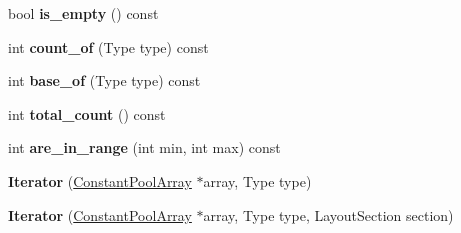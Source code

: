 \begin{DoxyCompactItemize}
\item 
\hypertarget{classv8_1_1internal_1_1_constant_pool_array_1_1_b_a_s_e___e_m_b_e_d_d_e_d_aef857b7d8765f26626cc341cf49f1578}{}bool {\bfseries is\+\_\+empty} () const \label{classv8_1_1internal_1_1_constant_pool_array_1_1_b_a_s_e___e_m_b_e_d_d_e_d_aef857b7d8765f26626cc341cf49f1578}

\item 
\hypertarget{classv8_1_1internal_1_1_constant_pool_array_1_1_b_a_s_e___e_m_b_e_d_d_e_d_aba6866eb837754b3c02573980bdd0345}{}int {\bfseries count\+\_\+of} (Type type) const \label{classv8_1_1internal_1_1_constant_pool_array_1_1_b_a_s_e___e_m_b_e_d_d_e_d_aba6866eb837754b3c02573980bdd0345}

\item 
\hypertarget{classv8_1_1internal_1_1_constant_pool_array_1_1_b_a_s_e___e_m_b_e_d_d_e_d_ac530db406f0110ab6c735ac22629d202}{}int {\bfseries base\+\_\+of} (Type type) const \label{classv8_1_1internal_1_1_constant_pool_array_1_1_b_a_s_e___e_m_b_e_d_d_e_d_ac530db406f0110ab6c735ac22629d202}

\item 
\hypertarget{classv8_1_1internal_1_1_constant_pool_array_1_1_b_a_s_e___e_m_b_e_d_d_e_d_a3b1ff6f3dbb6258f0b26c8a41a5f5aeb}{}int {\bfseries total\+\_\+count} () const \label{classv8_1_1internal_1_1_constant_pool_array_1_1_b_a_s_e___e_m_b_e_d_d_e_d_a3b1ff6f3dbb6258f0b26c8a41a5f5aeb}

\item 
\hypertarget{classv8_1_1internal_1_1_constant_pool_array_1_1_b_a_s_e___e_m_b_e_d_d_e_d_a46117385c19d858f8837b0598f9e4e24}{}int {\bfseries are\+\_\+in\+\_\+range} (int min, int max) const \label{classv8_1_1internal_1_1_constant_pool_array_1_1_b_a_s_e___e_m_b_e_d_d_e_d_a46117385c19d858f8837b0598f9e4e24}

\item 
\hypertarget{classv8_1_1internal_1_1_constant_pool_array_1_1_b_a_s_e___e_m_b_e_d_d_e_d_a29b07ac764360f872b00de58b3cd6dfb}{}{\bfseries Iterator} (\hyperlink{classv8_1_1internal_1_1_constant_pool_array}{Constant\+Pool\+Array} $\ast$array, Type type)\label{classv8_1_1internal_1_1_constant_pool_array_1_1_b_a_s_e___e_m_b_e_d_d_e_d_a29b07ac764360f872b00de58b3cd6dfb}

\item 
\hypertarget{classv8_1_1internal_1_1_constant_pool_array_1_1_b_a_s_e___e_m_b_e_d_d_e_d_aa15beca9d48fdf77877da4ff5bf84bdc}{}{\bfseries Iterator} (\hyperlink{classv8_1_1internal_1_1_constant_pool_array}{Constant\+Pool\+Array} $\ast$array, Type type, Layout\+Section section)\label{classv8_1_1internal_1_1_constant_pool_array_1_1_b_a_s_e___e_m_b_e_d_d_e_d_aa15beca9d48fdf77877da4ff5bf84bdc}


\end{DoxyCompactItemize}
